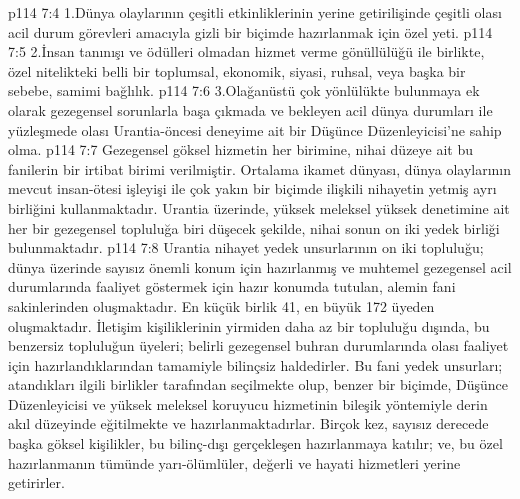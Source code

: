 \vs p114 7:4 1.\bibnobreakspace Dünya olaylarının çeşitli etkinliklerinin yerine getirilişinde çeşitli olası acil durum görevleri amacıyla gizli bir biçimde hazırlanmak için özel yeti.
\vs p114 7:5 2.\bibnobreakspace İnsan tanınışı ve ödülleri olmadan hizmet verme gönüllülüğü ile birlikte, özel nitelikteki belli bir toplumsal, ekonomik, siyasi, ruhsal, veya başka bir sebebe, samimi bağlılık.
\vs p114 7:6 3.\bibnobreakspace Olağanüstü çok yönlülükte bulunmaya ek olarak gezegensel sorunlarla başa çıkmada ve bekleyen acil dünya durumları ile yüzleşmede olası Urantia\hyp{}öncesi deneyime ait bir Düşünce Düzenleyicisi’ne sahip olma.
\vs p114 7:7 Gezegensel göksel hizmetin her birimine, nihai düzeye ait bu fanilerin bir irtibat birimi verilmiştir. Ortalama ikamet dünyası, dünya olaylarının mevcut insan\hyp{}ötesi işleyişi ile çok yakın bir biçimde ilişkili nihayetin yetmiş ayrı birliğini kullanmaktadır. Urantia üzerinde, yüksek meleksel yüksek denetimine ait her bir gezegensel topluluğa biri düşecek şekilde, nihai sonun on iki yedek birliği bulunmaktadır.
\vs p114 7:8 Urantia nihayet yedek unsurlarının on iki topluluğu; dünya üzerinde sayısız önemli konum için hazırlanmış ve muhtemel gezegensel acil durumlarında faaliyet göstermek için hazır konumda tutulan, alemin fani sakinlerinden oluşmaktadır. En küçük birlik 41, en büyük 172 üyeden oluşmaktadır. İletişim kişiliklerinin yirmiden daha az bir topluluğu dışında, bu benzersiz topluluğun üyeleri; belirli gezegensel buhran durumlarında olası faaliyet için hazırlandıklarından tamamiyle bilinçsiz haldedirler. Bu fani yedek unsurları; atandıkları ilgili birlikler tarafından seçilmekte olup, benzer bir biçimde, Düşünce Düzenleyicisi ve yüksek meleksel koruyucu hizmetinin bileşik yöntemiyle derin akıl düzeyinde eğitilmekte ve hazırlanmaktadırlar. Birçok kez, sayısız derecede başka göksel kişilikler, bu bilinç\hyp{}dışı gerçekleşen hazırlanmaya katılır; ve, bu özel hazırlanmanın tümünde yarı\hyp{}ölümlüler, değerli ve hayati hizmetleri yerine getirirler.
